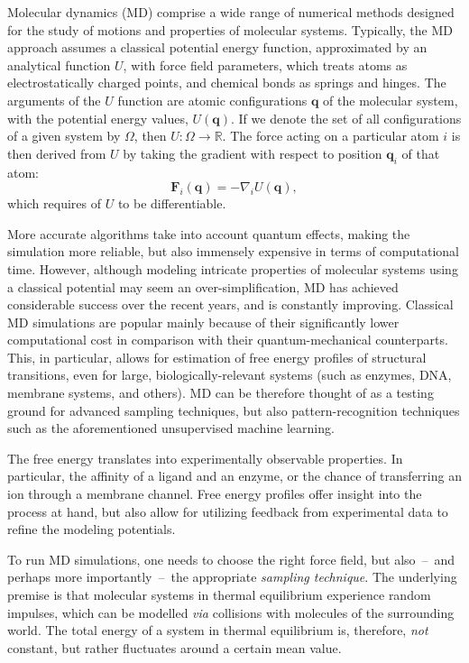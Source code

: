 \documentclass[a4paper,11pt,twoside]{book}%
\begin{document}
Molecular dynamics (MD) comprise a wide range of numerical methods designed for the study of motions and properties of molecular systems.
Typically, the MD approach assumes a classical potential energy function, approximated by an analytical function $U$, with force field parameters, which treats atoms as electrostatically charged points, and chemical bonds as springs and hinges.
The arguments of the $U$ function are atomic configurations $\mathbf{q}$ of the molecular system, with the potential energy values, $U(\mathbf{q})$.
If we denote the set of all configurations of a given system by $\Omega$, then $U\colon\Omega\to\mathbb{R}$. %
The force acting on a particular atom $i$ is then derived from $U$ by taking the gradient with respect to position $\mathbf{q}_i$ of that atom:
$$
\mathbf{F}_i(\mathbf{q}) = -\nabla_i U(\mathbf{q}),
$$
which requires of $U$ to be differentiable. 

More accurate algorithms take into account quantum effects, making the simulation more reliable, but also immensely expensive in terms of computational time.
However, although modeling intricate properties of molecular systems using a classical potential may seem an over-simplification, MD has achieved considerable success over the recent years, and is constantly improving.
Classical MD simulations are popular mainly because of their significantly lower computational cost in comparison with their quantum-mechanical counterparts.
This, in particular, allows for estimation of free energy profiles of structural transitions, even for large, biologically-relevant systems (such as enzymes, DNA, membrane systems, and others).
MD can be therefore thought of as a testing ground for advanced sampling techniques, but also pattern-recognition techniques such as the aforementioned unsupervised machine learning.

The free energy translates into experimentally observable properties.
In particular, the affinity of a ligand and an enzyme, or the chance of transferring an ion through a membrane channel.
Free energy profiles offer insight into the process at hand, but also allow for utilizing feedback from experimental data to refine the modeling potentials.

To run MD simulations, one needs to choose the right force field, but also~--~and perhaps more importantly~--~the appropriate \emph{sampling technique}.
The underlying premise is that molecular systems in thermal equilibrium experience random impulses, which can be modelled \emph{via} collisions with molecules of the surrounding world.
The total energy of a system in thermal equilibrium is, therefore, \emph{not} constant, but rather fluctuates around a certain mean value.
\end{document}
